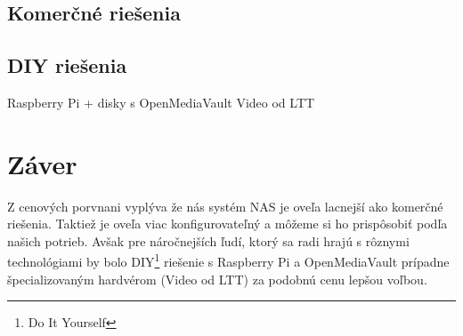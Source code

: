 \documentclass[12pt,oneside,slovak,a4paper]{article}
\begin{document}
\subsection{Komerčné riešenia}

\subsection{DIY riešenia}
Raspberry Pi + disky s OpenMediaVault
Video od LTT

\section{Záver}
Z cenových porvnani vyplýva že nás systém NAS je oveľa lacnejší ako komerčné riešenia. Taktiež je oveľa viac konfigurovateľný a môžeme si ho prispôsobiť podľa našich potrieb. Avšak pre náročnejších ľudí, ktorý sa radi hrajú s rôznymi technológiami by bolo DIY\footnote{Do It Yourself} riešenie s Raspberry Pi a OpenMediaVault prípadne špecializovaným hardvérom (Video od LTT) za podobnú cenu lepšou voľbou.




\end{document}
